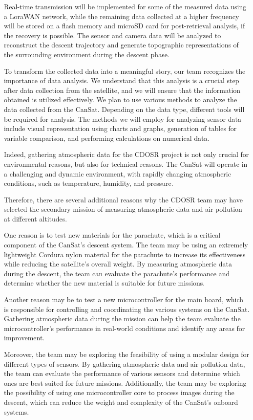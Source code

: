 \documentclass[11pt]{article}
\begin{document}
Real-time transmission will be implemented for some of the measured data using a LoraWAN network, while the remaining data collected at a higher frequency will be stored on a flash memory and microSD card for post-retrieval analysis, if the recovery is possible. The sensor and camera data will be analyzed to reconstruct the descent trajectory and generate topographic representations of the surrounding environment during the descent phase.

To transform the collected data into a meaningful story, our team recognizes the importance of data analysis. We understand that this analysis is a crucial step after data collection from the satellite, and we will ensure that the information obtained is utilized effectively. We plan to use various methods to analyze the data collected from the CanSat. Depending on the data type, different tools will be required for analysis. The methods we will employ for analyzing sensor data include visual representation using charts and graphs, generation of tables for variable comparison, and performing calculations on numerical data.

Indeed, gathering atmospheric data for the CDOSR project is not only crucial for environmental reasons, but also for technical reasons. The CanSat will operate in a challenging and dynamic environment, with rapidly changing atmospheric conditions, such as temperature, humidity, and pressure.

Therefore, there are several additional reasons why the CDOSR team may have selected the secondary mission of measuring atmospheric data and air pollution at different altitudes.

One reason is to test new materials for the parachute, which is a critical component of the CanSat's descent system. The team may be using an extremely lightweight Cordura nylon material for the parachute to increase its effectiveness while reducing the satellite's overall weight. By measuring atmospheric data during the descent, the team can evaluate the parachute's performance and determine whether the new material is suitable for future missions.

Another reason may be to test a new microcontroller for the main board, which is responsible for controlling and coordinating the various systems on the CanSat. Gathering atmospheric data during the mission can help the team evaluate the microcontroller's performance in real-world conditions and identify any areas for improvement.

Moreover, the team may be exploring the feasibility of using a modular design for different types of sensors. By gathering atmospheric data and air pollution data, the team can evaluate the performance of various sensors and determine which ones are best suited for future missions. Additionally, the team may be exploring the possibility of using one microcontroller core to process images during the descent, which can reduce the weight and complexity of the CanSat's onboard systems.
\end{document}
